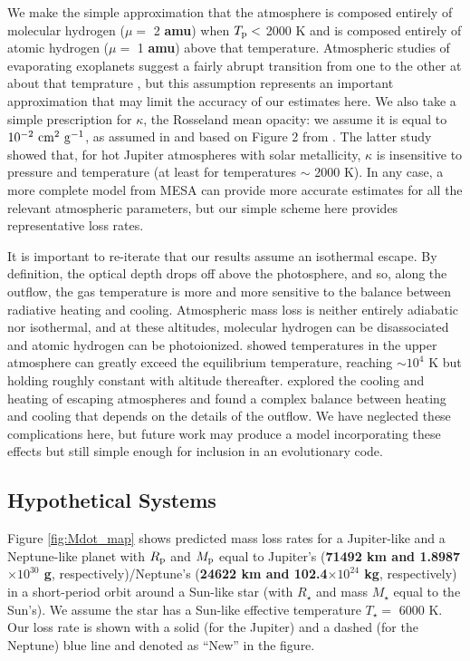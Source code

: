 \documentclass{aastex}
\begin{document}
We make the simple approximation that the atmosphere is composed entirely of molecular hydrogen ($\mu =$ 2 {\bf amu}) when $T_{\rm p} <$ 2000 K and is composed entirely of atomic hydrogen ($\mu =$ 1 {\bf amu}) above that temperature. Atmospheric studies of evaporating exoplanets suggest a fairly abrupt transition from one to the other at about that temprature \citep{2004Icar..170..167Y}, but this assumption represents an important approximation that may limit the accuracy of our estimates here. We also take a simple prescription for $\kappa$, the Rosseland mean opacity: we assume it is equal to $10^{-2}\ {\rm cm^2\ g^{-1}}$, as assumed in \citet{2010Natur.463.1054L} and based on Figure 2 from \citet{2008ApJS..174..504F}. The latter study showed that, for hot Jupiter atmospheres with solar metallicity, $\kappa$ is insensitive to pressure and temperature (at least for temperatures $\sim$ 2000 K). In any case, a more complete model from MESA can provide more accurate estimates for all the relevant atmospheric parameters, but our simple scheme here provides representative loss rates. 

It is important to re-iterate that our results assume an isothermal escape. By definition, the optical depth drops off above the photosphere, and so, along the outflow, the gas temperature is more and more sensitive to the balance between radiative heating and cooling. Atmospheric mass loss is neither entirely adiabatic nor isothermal, and at these altitudes, molecular hydrogen can be disassociated and atomic hydrogen can be photoionized. \citet{2011ApJ...728..152T} showed temperatures in the upper atmosphere can greatly exceed the equilibrium temperature, reaching $\sim 10^4$ K but holding roughly constant with altitude thereafter. \citet{2009ApJ...693...23M} explored the cooling and heating of escaping atmospheres and found a complex balance between heating and cooling that depends on the details of the outflow. We have neglected these complications here, but future work may produce a model incorporating these effects but still simple enough for inclusion in an evolutionary code.

\subsection{Hypothetical Systems}

Figure \ref{fig:Mdot_map} shows predicted mass loss rates for a Jupiter-like and a Neptune-like planet with $R_\mathrm{\rm p}$ and $M_{\rm p}$ equal to Jupiter's ({\bf 71492 km and 1.8987$\times10^{30}$ g}, respectively)/Neptune's ({\bf 24622 km and 102.4$\times10^{24}$ kg}, respectively) in a short-period orbit around a Sun-like star (with  $R_\mathrm\star$ and mass $M_\star$ equal to the Sun's). We assume the star has a Sun-like effective temperature $T_\star =$ 6000 K. Our loss rate is shown with a solid (for the Jupiter) and a dashed (for the Neptune) blue line and denoted as ``New'' in the figure. 
\end{document}
